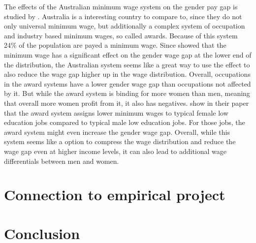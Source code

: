 \documentclass[12pt,draft,a4paper]{article}
\begin{document}
The effects of the Australian minimum wage system on the gender pay gap is studied by \citet{Broadway2017AUS}.
Australia is a interesting country to compare to, since they do not only universal minimum wage, but additionally a complex system of occupation and industry based minimum wages, so called awards. Because of this system 24\% of the population are payed a minimum wage. 
Since  showed that the minimum wage has a significant effect on the gender wage gap at the lower end of the distribution, the Australian system seems like a great way to use the effect to also reduce the wage gap higher up in the wage distribution. 
Overall, occupations in the award systems have a lower gender wage gap than occupations not affected by it.
But while the award system is binding for more women than men, meaning that overall more women profit from it, it also has negatives. \citeauthor{Broadway2017AUS} show in their paper that the award system assigns lower minimum wages to typical female low education jobs compared to typical male low education jobs.
For those jobs, the award system might even increase the gender wage gap.
Overall, while this system seems like a option to compress the wage distribution and reduce the wage gap even at higher income levels, it can also lead to additional wage differentials between men and women.





\section{Connection to empirical project} %


\section{Conclusion}


% 
\newpage

% 

\end{document}
